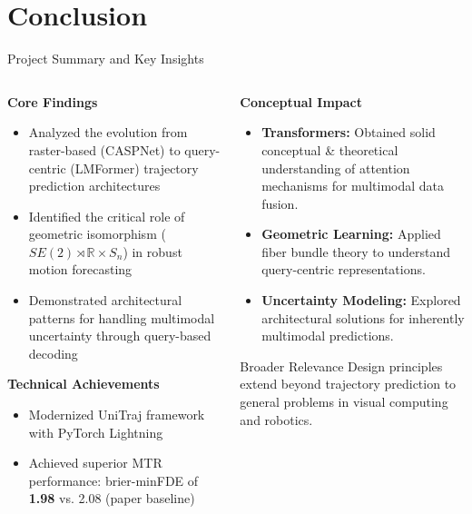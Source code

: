 \documentclass[10pt,aspectratio=169]{beamer}
\begin{document}
\section{Conclusion}

\begin{frame}{Project Summary and Key Insights}
    \begin{columns}[T]
        \begin{column}{0.55\textwidth}
            \textbf{Core Findings}
            \begin{itemize}
                \item Analyzed the evolution from raster-based (CASPNet) to query-centric (LMFormer) trajectory prediction architectures
                \item Identified the critical role of geometric isomorphism ($SE(2) \rtimes \mathbb{R} \times S_n$) in robust motion forecasting
                \item Demonstrated architectural patterns for handling multimodal uncertainty through query-based decoding
            \end{itemize}

            \textbf{Technical Achievements}
            \begin{itemize}
                \item Modernized UniTraj framework with PyTorch Lightning
                \item Achieved superior MTR performance: brier-minFDE of \textbf{1.98} vs. 2.08 (paper baseline)
            \end{itemize}
        \end{column}
        \begin{column}{0.42\textwidth}
            \textbf{Conceptual Impact}
            \begin{itemize}
                \item \textbf{Transformers:} Obtained solid conceptual \& theoretical understanding of attention mechanisms for multimodal data fusion.
                \item \textbf{Geometric Learning:} Applied fiber bundle theory to understand query-centric representations.
                \item \textbf{Uncertainty Modeling:} Explored architectural solutions for inherently multimodal predictions.
            \end{itemize}

            \begin{alertblock}{Broader Relevance}
                Design principles extend beyond trajectory prediction to general problems in visual computing and robotics.
            \end{alertblock}
        \end{column}
    \end{columns}
\end{frame}
\end{document}
